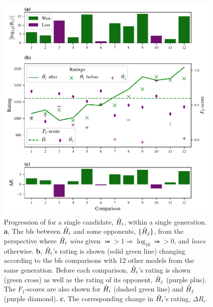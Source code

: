 \begin{figure}
    \begin{center}
        \includegraphics{theoretical_study/figures/single_generation_ratings_progression.pdf}
    \end{center}
    \caption[Single model within a single generation of \gls{qmla} ]{
        Progression of   for a single candidate, $\hat{H}_i$, within a single generation.
        \textbf{a}, The \glspl{bf} between $\hat{H}_i$ and some opponents, $\{\hat{H}_j\}$, 
            from the perspective where $\hat{H}_i$ \emph{wins} given $\bij > 1 \Rightarrow \log_{10}\bij > 0$, 
            and \emph{loses} otherwise. 
        \textbf{b}, $\hat{H}_i$'s rating is shown (solid green line) changing according to the \glspl{bf} 
            comparisons with 12 other models from the same generation. 
            Before each comparison, $\hat{H}_i$'s rating is shown (green cross)
            as well as the rating of its opponent, $\hat{H}_j$ (purple plus).
            The $F_1$-scores are also shown for $\hat{H}_i$ (dashed green line) and $\hat{H}_j$ (purple diamond).
        \textbf{c}, The corresponding change in $\hat{H}_i$'s rating, $\Delta R_i$. 
        \figtableref
    }
    \label{fig:single_models_elo_ratings}
\end{figure}

